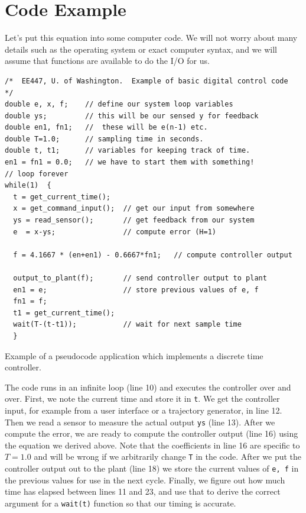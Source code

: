 
\section{Code Example}

 Let's put this equation into some computer code.  We will not worry about many details such as the operating system or exact computer syntax, and we will assume that functions are available to do the I/O for us.


\begin{listing}
\begin{verbatim}
/*  EE447, U. of Washington.  Example of basic digital control code  */
double e, x, f;    // define our system loop variables
double ys;         // this will be our sensed y for feedback
double en1, fn1;   //  these will be e(n-1) etc.
double T=1.0;      // sampling time in seconds.
double t, t1;      // variables for keeping track of time.
en1 = fn1 = 0.0;   // we have to start them with something!
// loop forever
while(1)  {
  t = get_current_time();
  x = get_command_input();  // get our input from somewhere
  ys = read_sensor();       // get feedback from our system
  e  = x-ys;                // compute error (H=1)

  f = 4.1667 * (en+en1) - 0.6667*fn1;   // compute controller output

  output_to_plant(f);       // send controller output to plant
  en1 = e;                  // store previous values of e, f
  fn1 = f;
  t1 = get_current_time();
  wait(T-(t-t1));           // wait for next sample time
  }
\end{verbatim}
\caption{Example of a pseudocode application which implements a discrete time controller.}
\label{lst:basicTustin}
\end{listing}	%


The code runs in an infinite loop (line 10) and executes the controller over and over.  First, we note the current time and store it in {\tt t}.  We get the controller input, for example from a user interface or a trajectory generator, in line 12.   Then we read a sensor to measure the actual output {\tt ys} (line 13).  After we compute the error, we are ready to compute the controller output (line 16) using the equation we derived above.  Note that the coefficients in line 16 are specific to $T=1.0$ and will be wrong if we arbitrarily change {\tt T} in the code.   After we put the controller output out to the plant (line 18) we store the current values of {\tt e, f} in the previous values for use in the next cycle.   Finally, we figure out how much time has elapsed between lines 11 and 23, and use that to derive the correct argument for a {\tt wait(t)} function so that our timing is accurate.

